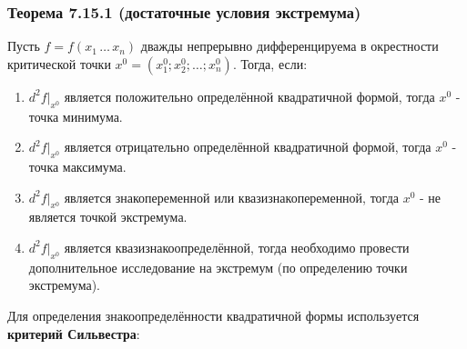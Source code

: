 \documentclass[12pt]{article}
\begin{document}
    \subsubsection*{Теорема 7.15.1 (достаточные условия экстремума)}\label{th:7.15.1}
    Пусть $f = f(x_1\, \dots\, x_n)$ дважды непрерывно дифференцируема в окрестности критической точки $x^0 = (x^0_1; x^0_2; \dots; x^0_n)$. Тогда, если:
    \begin{enumerate}
        \item $d^2f \Big|_{x^0}$ является положительно определённой квадратичной формой, тогда $x^0$ - точка минимума.
        \item $d^2f \Big|_{x^0}$ является отрицательно определённой квадратичной формой, тогда $x^0$ - точка максимума.
        \item $d^2f \Big|_{x^0}$ является знакопеременной или квазизнакопеременной, тогда $x^0$ - не является точкой экстремума.
        \item $d^2f \Big|_{x^0}$ является квазизнакоопределённой, тогда необходимо провести дополнительное исследование на экстремум (по определению точки экстремума).
    \end{enumerate}
    Для определения знакоопределённости квадратичной формы используется \textbf{критерий Сильвестра}:
\end{document}
